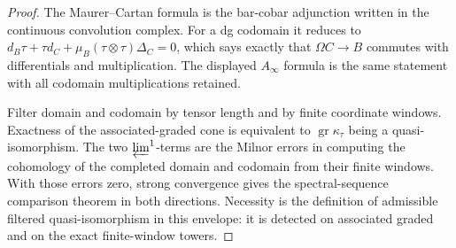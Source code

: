 \documentclass[11pt]{memoir}
\begin{document}
\begin{proof}
  The Maurer--Cartan formula is the bar-cobar adjunction written in the
  continuous convolution complex.  For a dg codomain it reduces to
  \(d_B\tau+\tau d_C+\mu_B(\tau\otimes\tau)\Delta_C=0\), which says
  exactly that \(\Omega C\to B\) commutes with differentials and
  multiplication.  The displayed \(A_\infty\) formula is the same
  statement with all codomain multiplications retained.

  Filter domain and codomain by tensor length and by finite coordinate
  windows.  Exactness of the associated-graded cone is equivalent to
  \(\operatorname{gr}\kappa_\tau\) being a quasi-isomorphism.  The two
  \(\varprojlim^1\)-terms are the Milnor errors in computing the
  cohomology of the completed domain and codomain from their finite
  windows.  With those errors zero, strong convergence gives the
  spectral-sequence comparison theorem in both directions.  Necessity
  is the definition of admissible filtered quasi-isomorphism in this
  envelope: it is detected on associated graded and on the exact
  finite-window towers.
\end{proof}
\end{document}
